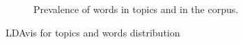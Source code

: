 \begin{figure}[h!]
\begin{subfigure}[h]{0.60\textwidth}
        \caption{Prevalence of words in topics and in the corpus.}
        \label{fig:trapez2}
    \end{subfigure}
    \caption{LDAvis for topics and words distribution}\label{figure 4.6}
\end{figure}
%


%
%
